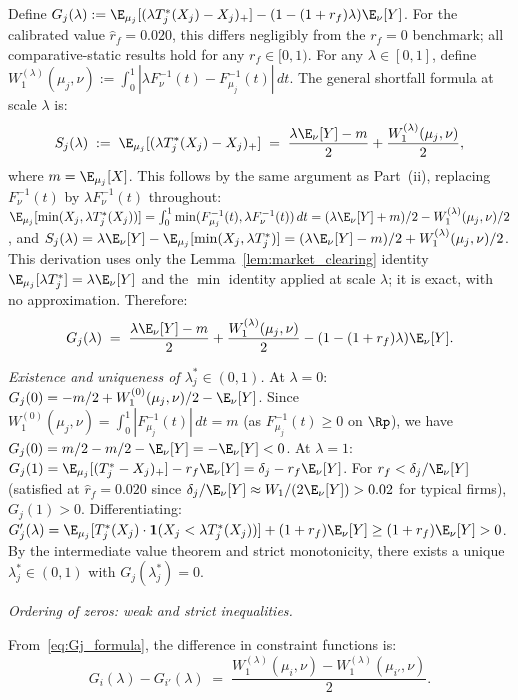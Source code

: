 Define $G_j(\lambda) := \E_{\mu_j}[(\lambda T_j^*(X_j)-X_j)_+] - (1-(1+r_f)\lambda)\E_\nu[Y]$. For the calibrated value $\hat{r}_f = 0.020$, this differs negligibly from the $r_f=0$ benchmark; all comparative-static results hold for any $r_f \in [0,1)$. For any $\lambda \in [0,1]$, define $W_1^{(\lambda)}(\mu_j,\nu) := \int_0^1|\lambda F_\nu^{-1}(t) - F_{\mu_j}^{-1}(t)|\,dt$. The general shortfall formula at scale $\lambda$ is:
\[
  S_j(\lambda) \;:=\; \E_{\mu_j}[(\lambda T_j^*(X_j)-X_j)_+] \;=\; \frac{\lambda\E_\nu[Y]-m}{2} + \frac{W_1^{(\lambda)}(\mu_j,\nu)}{2},
\]
where $m = \E_{\mu_j}[X]$. This follows by the same argument as Part~(ii), replacing $F_\nu^{-1}(t)$ by $\lambda F_\nu^{-1}(t)$ throughout: $\E_{\mu_j}[\min(X_j, \lambda T_j^*(X_j))] = \int_0^1 \min(F_{\mu_j}^{-1}(t), \lambda F_\nu^{-1}(t))\,dt = (\lambda\E_\nu[Y]+m)/2 - W_1^{(\lambda)}(\mu_j,\nu)/2$, and $S_j(\lambda) = \lambda\E_\nu[Y] - \E_{\mu_j}[\min(X_j, \lambda T_j^*)] = (\lambda\E_\nu[Y]-m)/2 + W_1^{(\lambda)}(\mu_j,\nu)/2$. This derivation uses only the Lemma~\ref{lem:market_clearing} identity $\E_{\mu_j}[\lambda T_j^*] = \lambda\E_\nu[Y]$ and the $\min$ identity applied at scale $\lambda$; it is exact, with no approximation. Therefore:
\begin{equation}
  G_j(\lambda) \;=\; \frac{\lambda\E_\nu[Y]-m}{2} + \frac{W_1^{(\lambda)}(\mu_j,\nu)}{2} - (1-(1+r_f)\lambda)\E_\nu[Y].
  \label{eq:Gj_formula}
\end{equation}

\emph{Existence and uniqueness of $\lambda_j^* \in (0,1)$.}
At $\lambda=0$: $G_j(0) = -m/2 + W_1^{(0)}(\mu_j,\nu)/2 - \E_\nu[Y]$. Since $W_1^{(0)}(\mu_j,\nu) = \int_0^1|F_{\mu_j}^{-1}(t)|\,dt = m$ (as $F_{\mu_j}^{-1}(t) \geq 0$ on $\Rp$), we have $G_j(0) = m/2 - m/2 - \E_\nu[Y] = -\E_\nu[Y] < 0$.
At $\lambda=1$: $G_j(1) = \E_{\mu_j}[(T_j^*-X_j)_+] - r_f \E_\nu[Y] = \delta_j - r_f\E_\nu[Y]$. For $r_f < \delta_j/\E_\nu[Y]$ (satisfied at $\hat{r}_f=0.020$ since $\delta_j/\E_\nu[Y] \approx W_1/(2\E_\nu[Y]) > 0.02$ for typical firms), $G_j(1) > 0$.
Differentiating: $G_j'(\lambda) = \E_{\mu_j}[T_j^*(X_j)\cdot\mathbf{1}(X_j < \lambda T_j^*(X_j))] + (1+r_f)\E_\nu[Y] \geq (1+r_f)\E_\nu[Y] > 0$.
By the intermediate value theorem and strict monotonicity, there exists a unique $\lambda_j^* \in (0,1)$ with $G_j(\lambda_j^*) = 0$.

\emph{Ordering of zeros: weak and strict inequalities.}

From~\eqref{eq:Gj_formula}, the difference in constraint functions is:
\[
  G_i(\lambda) - G_{i'}(\lambda) \;=\; \frac{W_1^{(\lambda)}(\mu_i,\nu) - W_1^{(\lambda)}(\mu_{i'},\nu)}{2}.
\]

